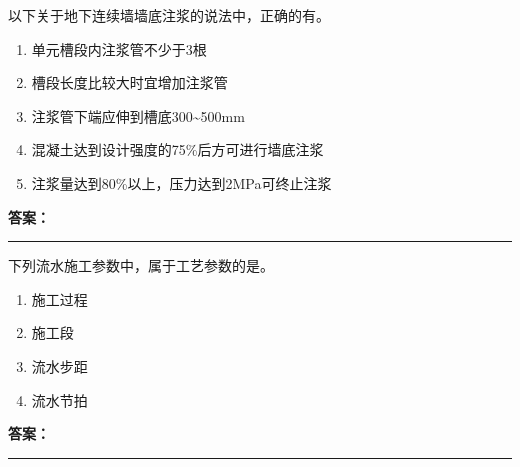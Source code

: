 \documentclass[UTF8,fontset=fandol,11pt]{ctexart}
\newcommand{\answerline}{\textcolor{answerred}{\rule{2.4cm}{0.7pt}}}
\begin{document}
\vspace{0.2em}

\begin{quizbox}[title={乱序第 31 题｜第三章基坑工程}]

以下关于地下连续墙墙底注浆的说法中，正确的有。\\

\begin{enumerate}[label=\Alph*.]

\item 单元槽段内注浆管不少于3根

\item 槽段长度比较大时宜增加注浆管

\item 注浆管下端应伸到槽底300\textasciitilde{}500mm

\item 混凝土达到设计强度的75\%后方可进行墙底注浆

\item 注浆量达到80\%以上，压力达到2MPa可终止注浆

\end{enumerate}

\textbf{\textcolor{answerred}{答案：}} \answerline

\end{quizbox}

\vspace{0.2em}

\begin{quizbox}[title={乱序第 32 题｜第十章流水施工原理}]

下列流水施工参数中，属于工艺参数的是。\\

\begin{enumerate}[label=\Alph*.]

\item 施工过程

\item 施工段

\item 流水步距

\item 流水节拍

\end{enumerate}

\textbf{\textcolor{answerred}{答案：}} \answerline

\end{quizbox}

\vspace{0.2em}
\end{document}
